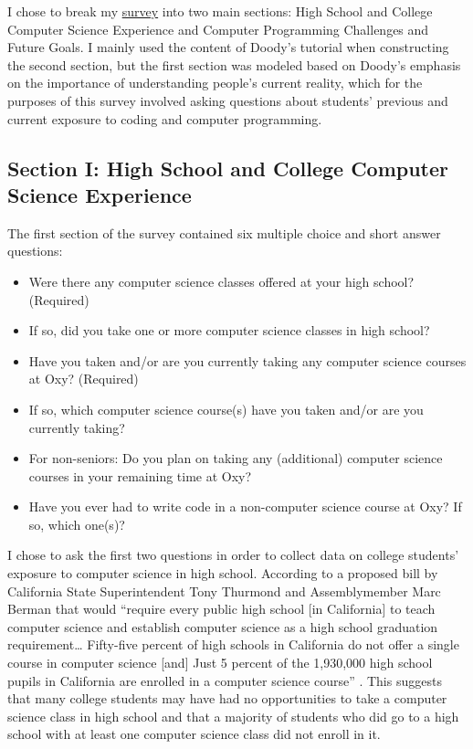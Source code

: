 \documentclass[10pt,twocolumn]{article}
\begin{document}
I chose to break my \href{https://forms.gle/5nDPNGqh9LwYLMVQ6}{survey} into two main sections: High School and College Computer Science Experience and Computer Programming Challenges and Future Goals. I mainly used the content of Doody’s tutorial when constructing the second section, but the first section was modeled based on Doody’s emphasis on the importance of understanding people’s current reality, which for the purposes of this survey involved asking questions about students’ previous and current exposure to coding and computer programming.

\subsection{Section I: High School and College Computer Science Experience}

The first section of the survey contained six multiple choice and short answer questions:
 \begin{itemize}
    \item{Were there any computer science classes offered at your high school? (Required)}
    \item{If so, did you take one or more computer science classes in high school?}
    \item{Have you taken and/or are you currently taking any computer science courses at Oxy? (Required)}
    \item{If so, which computer science course(s) have you taken and/or are you currently taking?}
    \item{For non-seniors: Do you plan on taking any (additional) computer science courses in your remaining time at Oxy?}
    \item{Have you ever had to write code in a non-computer science course at Oxy? If so, which one(s)?}
\end{itemize}

I chose to ask the first two questions in order to collect data on college students’ exposure to computer science in high school. According to a proposed bill by California State Superintendent Tony Thurmond and Assemblymember Marc Berman that would “require every public high school [in California] to teach computer science and establish computer science as a high school graduation requirement… Fifty-five percent of high schools in California do not offer a single course in computer science [and] Just 5 percent of the 1,930,000 high school pupils in California are enrolled in a computer science course” \cite{Bill}. This suggests that many college students may have had no opportunities to take a computer science class in high school and that a majority of students who did go to a high school with at least one computer science class did not enroll in it. 
\end{document}
